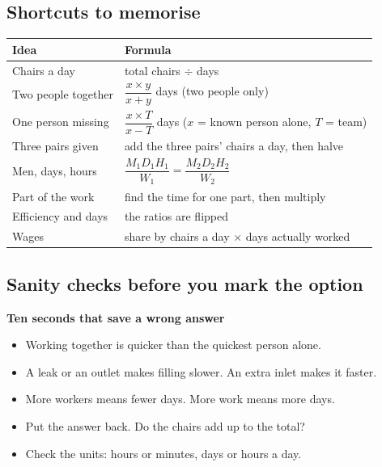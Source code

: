 \documentclass[11pt,a4paper]{article}
\let\oldsubsection\subsection
\renewcommand{\subsection}{\needspace{9\baselineskip}\oldsubsection}
\newcommand{\infobox}[2]{\par\medskip\noindent\begingroup\setlength{\fboxsep}{7pt}%
  \colorbox{codebg}{\parbox{\dimexpr\linewidth-14pt\relax}{\textbf{\color{ember}#1}\par\smallskip #2}}\endgroup\par\medskip}
\begin{document}
\subsection*{Shortcuts to memorise}
\begin{center}\small\renewcommand{\arraystretch}{1.75}\setlength{\tabcolsep}{8pt}
\begin{tabularx}{\linewidth}{@{}>{\raggedright\arraybackslash}X>{\raggedright\arraybackslash}X@{}}
\toprule
\textbf{\color{slate}Idea} & \textbf{\color{slate}Formula} \\ \midrule
Chairs a day & total chairs $\div$ days \\
Two people together & $\dfrac{x \times y}{x+y}$ days (two people only) \\
One person missing & $\dfrac{x \times T}{x-T}$ days ($x$ = known person alone, $T$ = team) \\
Three pairs given & add the three pairs' chairs a day, then halve \\
Men, days, hours & $\dfrac{M_1D_1H_1}{W_1}=\dfrac{M_2D_2H_2}{W_2}$ \\
Part of the work & find the time for one part, then multiply \\
Efficiency and days & the ratios are flipped \\
Wages & share by chairs a day $\times$ days actually worked \\
\bottomrule
\end{tabularx}\end{center}

\subsection*{Sanity checks before you mark the option}
\infobox{Ten seconds that save a wrong answer}{
\begin{itemize}
\item Working together is quicker than the quickest person alone.
\item A leak or an outlet makes filling slower. An extra inlet makes it faster.
\item More workers means fewer days. More work means more days.
\item Put the answer back. Do the chairs add up to the total?
\item Check the units: hours or minutes, days or hours a day.
\end{itemize}}
\end{document}
